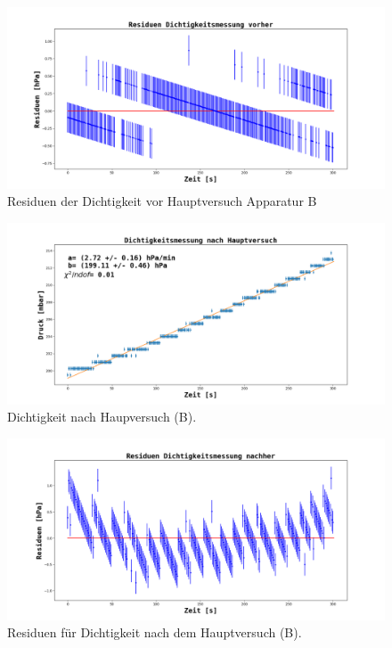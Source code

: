 \documentclass[12pt,a4paper]{article}
\begin{document}
\begin{figure}
\includegraphics[width=\linewidth]{Bilder/Residuen_Dichtigkeit_vorher_B.png}
\caption[Dichtigkeit vor Hauptversuch Apparatur B]{Residuen der Dichtigkeit vor Hauptversuch Apparatur B}
\label{fig:ResiduenDichtigkeitB}
\end{figure}

\begin{figure}
\includegraphics[width=\linewidth]{Bilder/Dichtigkeit_nachher_B.png}
\caption[Dichtigkeit B nachher]{Dichtigkeit nach Haupversuch (B).}
\label{fig:DichtigkeitNachherB}
\end{figure}

\begin{figure}
\includegraphics[width=\linewidth]{Bilder/Residuen_Dichtigkeit_nachher_B}
\caption{Residuen für Dichtigkeit nach dem Hauptversuch (B).}
\label{fig:ResiduenDichtigkeitNachherB}
\end{figure}
\end{document}
